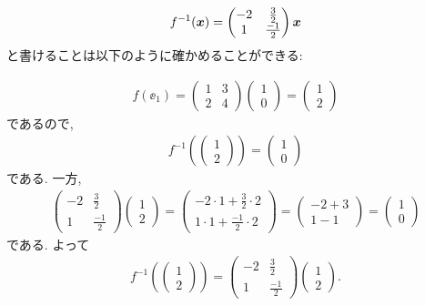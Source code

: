 \begin{checkanswer}%
  \begin{align*}
    f^{-1}(\boldsymbol{x}) = \begin{pmatrix}-2&\frac{3}{2}\\1&\frac{-1}{2}\end{pmatrix}\boldsymbol{x}
  \end{align*}
  と書けることは以下のように確かめることができる:

  \begin{align*}
    f(\ee_1)=\begin{pmatrix}1&3\\2&4\end{pmatrix}\begin{pmatrix}1\\0\end{pmatrix}
      =\begin{pmatrix}1\\2\end{pmatrix}
  \end{align*}
  であるので,
  \begin{align*}
    f^{-1}(\begin{pmatrix}1\\2\end{pmatrix})=\begin{pmatrix}1\\0\end{pmatrix}
  \end{align*}
  である. 一方,
  \begin{align*}
    \begin{pmatrix}-2&\frac{3}{2}\\1&\frac{-1}{2}\end{pmatrix}\begin{pmatrix}1\\2\end{pmatrix}
      =
      \begin{pmatrix}-2\cdot 1+\frac{3}{2}\cdot 2\\1\cdot 1+\frac{-1}{2}\cdot 2\end{pmatrix}
      =
      \begin{pmatrix}-2+3\\1-1\end{pmatrix}
      =
      \begin{pmatrix}1\\0\end{pmatrix}
  \end{align*}
  である.  よって
  \begin{align*}
    f^{-1}(\begin{pmatrix}1\\2\end{pmatrix})=
      \begin{pmatrix}-2&\frac{3}{2}\\1&\frac{-1}{2}\end{pmatrix}\begin{pmatrix}1\\2\end{pmatrix}.
  \end{align*}


\end{checkanswer}
